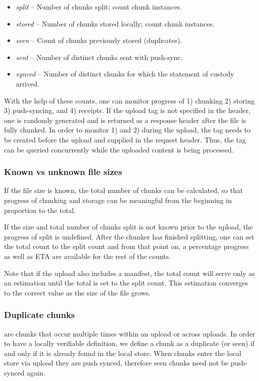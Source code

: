 \begin{itemize}
\item \emph{split} -- Number of chunks split; count chunk instances.
\item \emph{stored} -- Number of chunks stored locally; count chunk instances.
\item \emph{seen} -- Count of chunks previously stored (duplicates).
\item \emph{sent} -- Number of distinct chunks sent with push-sync.
\item \emph{synced} -- Number of distinct chunks for which the statement of custody arrived.
\end{itemize}

With the help of these counts, one can monitor progress of 1) chunking 2) storing 3) push-syncing, and 4) receipts.
If the upload tag is not specified in the header, one is randomly generated and is returned as a response header after the file is fully chunked. In order to monitor 1) and  2) during the upload, the tag needs to be created before the upload and supplied in the request header. Thus, the tag can be queried concurrently while the uploaded content is being processed. 

\subsubsection{Known vs unknown file sizes}

If the file size is known, the total number of chunks can be calculated, so that progress of chunking and storage can be meaningful from the beginning in proportion to the total.

If the size and total number of chunks split is not known prior to the upload, the progress of split is undefined. After the chunker has finished splitting, one can set the total count to the split count and from that point on, a percentage progress as well as ETA are available for the rest of the counts.

Note that if the upload also includes a manifest, the total count will serve only as an estimation until the total is set to the split count. This estimation converges to the correct value as the size of the file grows.


\subsubsection{Duplicate chunks}

 are chunks that occur multiple times within an upload or across uploads. In order to have a locally verifiable definition, we define a chunk as a duplicate (or seen) if and only if it is already found in the local store.
When chunks enter the local store via upload they are push synced, therefore seen chunks need not be push-synced again.

